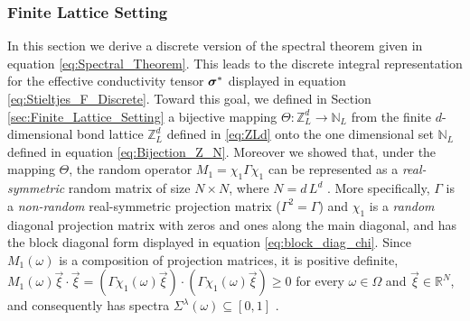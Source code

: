 \documentclass{cmslatex}
\newcommand\bsig{\mbox{\boldmath${\sigma}$}}
\newcommand\bmu{\mbox{\boldmath${\mu}$}}
\begin{document}





\subsubsection{Finite Lattice Setting}
\label{sec:The_Spectral_Theorem_Finite_Lattice}
%
In this section we derive a discrete version of the spectral theorem
given in equation  \eqref{eq:Spectral_Theorem}. This leads to
the discrete integral representation for the effective
conductivity tensor $\bsig^*$ displayed in equation
\eqref{eq:Stieltjes_F_Discrete}. Toward this goal, we defined in
Section \ref{sec:Finite_Lattice_Setting} a bijective mapping
$\Theta:\mathbb{Z}_L^d\to\mathbb{N}_L$ from the finite $d$-dimensional bond
lattice $\mathbb{Z}_L^d$ defined in \eqref{eq:ZLd} onto the one
dimensional set $\mathbb{N}_L$ defined in equation
\eqref{eq:Bijection_Z_N}. Moreover we showed that, under the mapping
$\Theta$, the random operator $M_1=\chi_1\Gamma\chi_1$ can be represented as a
\emph{real-symmetric} random matrix of size $N\times N$, where $N=d\,L^d$
\cite{Golden:J_Biomech:337,Murphy:JMP:063506}. More specifically, $\Gamma$
is a \emph{non-random} real-symmetric projection matrix ($\Gamma^2=\Gamma$) and
$\chi_1$ is a \emph{random} diagonal projection matrix with zeros and
ones along the main diagonal, and has the block diagonal form
displayed in equation \eqref{eq:block_diag_chi}. Since $M_1(\omega)$ is a
composition of projection matrices, it is positive definite,
$M_1(\omega)\vec{\xi}\cdot\vec{\xi}=(\Gamma\chi_1(\omega)\vec{\xi})\cdot(\Gamma\chi_1(\omega)\vec{\xi})\geq0$ for every
$\omega\in\Omega$ and $\vec{\xi}\in\mathbb{R}^N$, and consequently has spectra
$\Sigma^\lambda(\omega)\subseteq[0,1]$ \cite{Halmos-1958}.   
\end{document}
